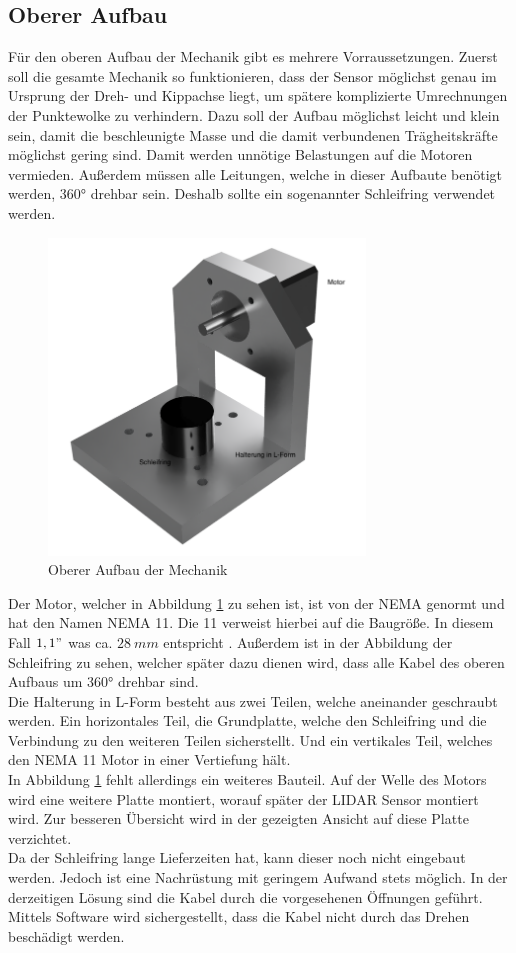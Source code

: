\subsection{Oberer Aufbau}
Für den oberen Aufbau der Mechanik gibt es mehrere Vorraussetzungen. Zuerst soll die gesamte Mechanik so funktionieren, dass der Sensor möglichst genau im Ursprung der Dreh- und Kippachse liegt, um spätere komplizierte Umrechnungen der Punktewolke zu verhindern. Dazu soll der Aufbau möglichst leicht und klein sein, damit die beschleunigte Masse und die damit verbundenen Trägheitskräfte möglichst gering sind. Damit werden unnötige Belastungen auf die Motoren vermieden. Außerdem müssen alle Leitungen, welche in dieser Aufbaute benötigt werden, 360° drehbar sein. Deshalb sollte ein sogenannter Schleifring verwendet werden. 
\begin{figure}[H]
	\centering
	\includegraphics[width=0.75\textwidth]{images/Mechanik/ObererAufbau}
	\caption{Oberer Aufbau der Mechanik}
	\label{obereraufbau}
\end{figure}
Der Motor, welcher in Abbildung \ref{obereraufbau} zu sehen ist, ist von der \ac{NEMA} genormt und hat den Namen \ac{NEMA} 11. Die 11 verweist hierbei auf die Baugröße. In diesem Fall $1,1"$ was ca. $28\:mm$ entspricht \cite{NEMA}. Außerdem ist in der Abbildung der Schleifring zu sehen, welcher später dazu dienen wird, dass alle Kabel des oberen Aufbaus um 360° drehbar sind. \\
Die Halterung in L-Form besteht aus zwei Teilen, welche aneinander geschraubt werden. Ein horizontales Teil, die Grundplatte, welche den Schleifring und die Verbindung zu den weiteren Teilen sicherstellt. Und ein vertikales Teil, welches den \ac{NEMA} 11 Motor in einer Vertiefung hält.\\
In Abbildung \ref{obereraufbau} fehlt allerdings ein weiteres Bauteil. Auf der Welle des Motors wird eine weitere Platte montiert, worauf später der \ac{LIDAR} Sensor montiert wird. Zur besseren Übersicht wird in der gezeigten Ansicht auf diese Platte verzichtet.\\
Da der Schleifring lange Lieferzeiten hat, kann dieser noch nicht eingebaut werden. Jedoch ist eine Nachrüstung mit geringem Aufwand stets möglich. In der derzeitigen Lösung sind die Kabel durch die vorgesehenen Öffnungen geführt. Mittels Software wird sichergestellt, dass die Kabel nicht durch das Drehen beschädigt werden. 
